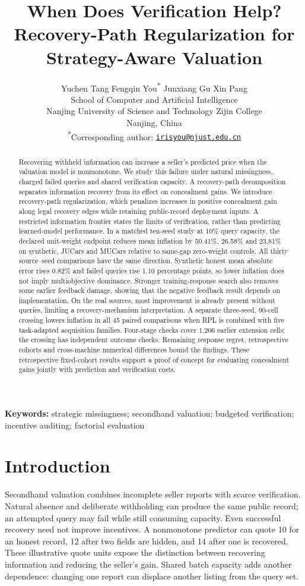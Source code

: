 \documentclass[11pt]{article}
\title{When Does Verification Help?\\Recovery-Path Regularization for Strategy-Aware Valuation}
\author{Yuchen Tang \quad Fengqin You\textsuperscript{*} \quad Junxiang Gu \quad Xin Pang\\[.5em]
\small School of Computer and Artificial Intelligence\\
\small Nanjing University of Science and Technology Zijin College\\
\small Nanjing, China\\[.4em]
\small \textsuperscript{*}Corresponding author: \href{mailto:irisyou@njust.edu.cn}{\texttt{irisyou@njust.edu.cn}}}
\date{}
\begin{document}
\maketitle
\begin{abstract}
Recovering withheld information can increase a seller's predicted price when the valuation model is nonmonotone. We study this failure under natural missingness, charged failed queries and shared verification capacity. A recovery-path decomposition separates information recovery from its effect on concealment gains. We introduce recovery-path regularization, which penalizes increases in positive concealment gain along legal recovery edges while retaining public-record deployment inputs. A restricted information frontier states the limits of verification, rather than predicting learned-model performance. In a matched ten-seed study at 10\% query capacity, the declared unit-weight endpoint reduces mean inflation by 50.41\%, 26.58\% and 23.81\% on synthetic, JUCars and MUCars relative to same-gap zero-weight controls. All thirty source--seed comparisons have the same direction. Synthetic honest mean absolute error rises 0.82\% and failed queries rise 1.10 percentage points, so lower inflation does not imply multiobjective dominance. Stronger training-response search also removes some earlier feedback damage, showing that the negative feedback result depends on implementation. On the real sources, most improvement is already present without queries, limiting a recovery-mechanism interpretation. A separate three-seed, 90-cell crossing lowers inflation in all 45 paired comparisons when RPL is combined with five task-adapted acquisition families. Four-stage checks cover 1,206 earlier extension cells; the crossing has independent outcome checks. Remaining response regret, retrospective cohorts and cross-machine numerical differences bound the findings. These retrospective fixed-cohort results support a proof of concept for evaluating concealment gains jointly with prediction and verification costs.
\end{abstract}

\noindent\textbf{Keywords:} strategic missingness; secondhand valuation; budgeted verification; incentive auditing; factorial evaluation

\section{Introduction}\label{sec:introduction}
Secondhand valuation combines incomplete seller reports with scarce
verification. Natural absence and deliberate withholding can produce the same
public record; an attempted query may fail while still consuming capacity.
Even successful recovery need not improve incentives. A nonmonotone predictor
can quote 10 for an honest record, 12 after two fields are hidden, and 14 after
one is recovered. These illustrative quote units expose the distinction
between recovering information and reducing the seller's gain. Shared batch
capacity adds another dependence: changing one report can displace another
listing from the query set.
\end{document}
